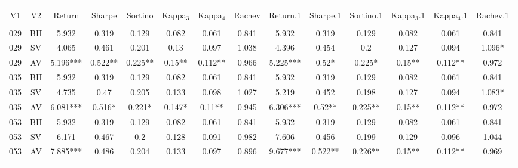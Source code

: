 
\begin{table}[!htbp] \centering 
  \caption{} 
  \label{} 
\begin{tabular}{@{\extracolsep{5pt}} cccccccccccccc} 
\\[-1.8ex]\hline 
\hline \\[-1.8ex] 
V1 & V2 & Return & Sharpe & Sortino & Kappa$_{3}$ & Kappa$_{4}$ & Rachev & Return.1 & Sharpe.1 & Sortino.1 & Kappa$_{3}$.1 & Kappa$_{4}$.1 & Rachev.1 \\ 
\hline \\[-1.8ex] 
029 & BH & 5.932 & 0.319 & 0.129 & 0.082 & 0.061 & 0.841 & 5.932 & 0.319 & 0.129 & 0.082 & 0.061 & 0.841 \\ 
029 & SV & 4.065 & 0.461 & 0.201 & 0.13 & 0.097 & 1.038 & 4.396 & 0.454 & 0.2 & 0.127 & 0.094 & 1.096* \\ 
029 & AV & 5.196*** & 0.522** & 0.225** & 0.15** & 0.112** & 0.966 & 5.225*** & 0.52* & 0.225* & 0.15** & 0.112** & 0.972 \\ 
035 & BH & 5.932 & 0.319 & 0.129 & 0.082 & 0.061 & 0.841 & 5.932 & 0.319 & 0.129 & 0.082 & 0.061 & 0.841 \\ 
035 & SV & 4.735 & 0.47 & 0.205 & 0.133 & 0.098 & 1.027 & 5.219 & 0.452 & 0.198 & 0.127 & 0.094 & 1.083* \\ 
035 & AV & 6.081*** & 0.516* & 0.221* & 0.147* & 0.11** & 0.945 & 6.306*** & 0.52** & 0.225** & 0.15** & 0.112** & 0.972 \\ 
053 & BH & 5.932 & 0.319 & 0.129 & 0.082 & 0.061 & 0.841 & 5.932 & 0.319 & 0.129 & 0.082 & 0.061 & 0.841 \\ 
053 & SV & 6.171 & 0.467 & 0.2 & 0.128 & 0.091 & 0.982 & 7.606 & 0.456 & 0.199 & 0.129 & 0.096 & 1.044 \\ 
053 & AV & 7.885*** & 0.486 & 0.204 & 0.133 & 0.097 & 0.896 & 9.677*** & 0.522** & 0.226** & 0.15** & 0.112** & 0.969 \\ 
\hline \\[-1.8ex] 
\end{tabular} 
\end{table} 
